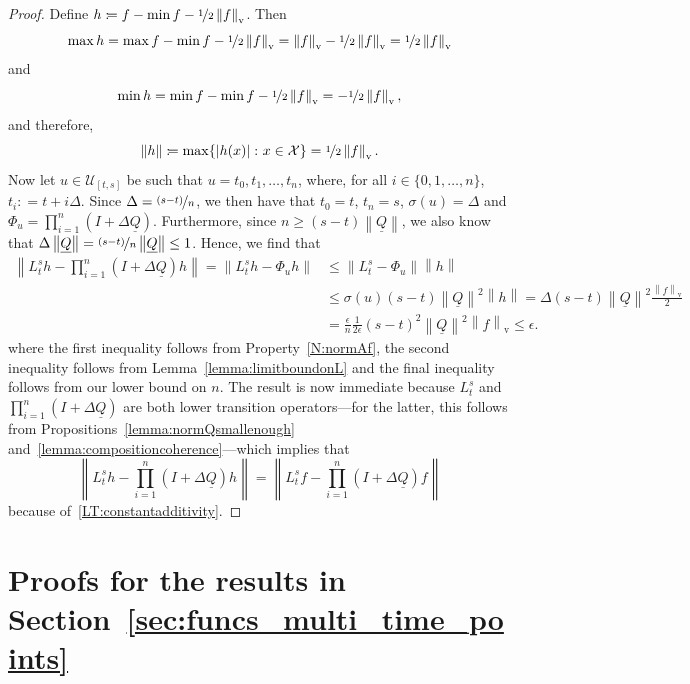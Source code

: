 \documentclass[10pt,a4paper]{paper}
\theoremstyle{definition}
\newcommand{\states}{\mathcal{X}}
\newcommand{\lrate}{\underline{Q}}
\newcommand{\norm}[1]{\left\lVert #1 \right\rVert}
\newcommand{\abs}[1]{\left\vert #1 \right\vert}
\newcommand{\coloneqq}{:\!=}
\begin{document}
\propapproximationerrorbound*
\begin{proof}
Define $h\coloneqq f-\min f-\nicefrac{1}{2}\norm{f}_\mathrm{v}$. Then
\begin{equation*}
\max h
=\max f-\min f-\nicefrac{1}{2}\norm{f}_\mathrm{v}
=\norm{f}_\mathrm{v}-\nicefrac{1}{2}\norm{f}_\mathrm{v}
=\nicefrac{1}{2}\norm{f}_\mathrm{v}
\end{equation*}
and
\begin{equation*}
\min h
=\min f-\min f-\nicefrac{1}{2}\norm{f}_\mathrm{v}
=-\nicefrac{1}{2}\norm{f}_\mathrm{v},
\end{equation*}
and therefore, 
\begin{equation*}
\norm{h}
\coloneqq
\max\{\abs{h(x)}\colon x\in\states\}
=\nicefrac{1}{2}\norm{f}_\mathrm{v}.
\end{equation*}
Now let $u\in\mathcal{U}_{[t,s]}$ be such that $u=t_0,t_1,\ldots,t_n$, where, for all $i\in\{0,1,\ldots,n\}$, $t_i\coloneqq t + i\Delta$. Since $\Delta=\nicefrac{(s-t)}{n}$, we then have that $t_0=t$, $t_n=s$, $\sigma(u)=\Delta$ and $\Phi_u= \prod_{i=1}^n(I+\Delta\lrate)$.
Furthermore, since $n\geq (s-t)\norm{\lrate}$, we also know that $\Delta\norm{\lrate}=\nicefrac{(s-t)}{n}\norm{\lrate}\leq 1$. Hence, we find that
\begin{align*}
\norm{L_t^sh - \prod_{i=1}^n(I+\Delta\lrate)h} = \norm{L_t^sh - \Phi_uh} &\leq \norm{L_t^s - \Phi_u}\norm{h} \\[-8pt]
 &\leq \sigma(u)(s-t)\norm{\lrate}^2\norm{h} = \Delta(s-t)\norm{\lrate}^2\frac{\norm{f}_\mathrm{v}}{2}\\
 &= 
\frac{\epsilon}{n}\frac{1}{2\epsilon}(s-t)^2\norm{\lrate}^2\norm{f}_\mathrm{v}
 \leq \epsilon.
\end{align*}
where the first inequality follows from Property~\ref{N:normAf}, the second inequality follows from Lemma~\ref{lemma:limitboundonL} and the final inequality follows from our lower bound on $n$. The result is now immediate because $L_t^s$ and $\prod_{i=1}^n(I+\Delta\lrate)$ are both lower transition operators---for the latter, this follows from Propositions~\ref{lemma:normQsmallenough} and~\ref{lemma:compositioncoherence}---which implies that
\begin{equation*}
\norm{L_t^sh - \prod_{i=1}^n(I+\Delta\lrate)h}
=
\norm{L_t^sf - \prod_{i=1}^n(I+\Delta\lrate)f}
\end{equation*}
because of~\ref{LT:constantadditivity}.
\end{proof}

\section{Proofs for the results in Section~\ref{sec:funcs_multi_time_points}}
\end{document}
